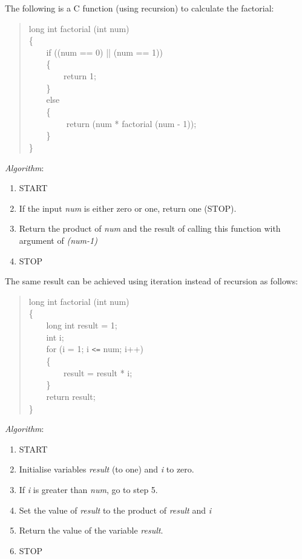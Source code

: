 \documentclass[a4paper,12pt]{article}
\begin{document}
The following is a C function (using recursion) to calculate the factorial:\\
\begin{quote}
long int factorial (int num)\\
\{\\
\verb|    |if ((num == 0) || (num == 1))\\
\verb|    |\{\\
\verb|        |return 1;\\
\verb|    |\}\\
\verb|    |else\\
\verb|    |\{\\
\verb|        | return (num * factorial (num - 1));\\
\verb|    |\}\\
\}\\
\end{quote}
\emph{Algorithm}:\\
\begin{enumerate}
\item START
\item If the input \textit{num} is either zero or one, return one (STOP).
\item Return the product of \textit{num} and the result of calling this function with argument of \emph{(num-1)}
\item STOP
\end{enumerate}
The same result can be achieved using iteration instead of recursion as follows:\\
\begin{quote}
long int factorial (int num)\\
\{\\
\verb|    |long int result = 1;\\
\verb|    |int i;\\
\verb|    |for (i = 1; i \verb|<=| num; i++)\\
\verb|    |\{\\
\verb|    |\verb|    |result = result * i;\\
\verb|    |\}\\
\verb|    |return result;\\
\}\\
\end{quote}
\emph{Algorithm}:\\
\begin{enumerate}
\item START
\item Initialise variables \textit{result} (to one) and \textit{i} to zero.
\item If \emph{i} is greater than \emph{num}, go to step 5.
\item Set the value of \emph{result} to the product of \emph{result} and \emph{i}
\item Return the value of the variable \emph{result}.
\item STOP
\end{enumerate}
\end{document}
